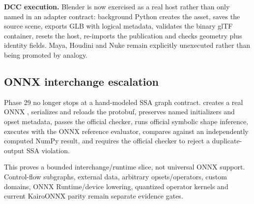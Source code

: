 \textbf{DCC execution.} Blender is now exercised as a real host rather than only named in an adapter contract: background Python creates the asset, saves the source scene, exports GLB with logical metadata, validates the binary glTF container, resets the host, re-imports the publication and checks geometry plus identity fields. Maya, Houdini and Nuke remain explicitly unexecuted rather than being promoted by analogy.

\subsection{ONNX interchange escalation}\label{appendix-2358b21a702d-onnx-interchange-escalation}

\hypertarget{appendix-2358b21a702d-onnx-interchange-escalation}{}

Phase 29 no longer stops at a hand-modeled SSA graph contract.  creates a real ONNX , serializes and reloads the protobuf, preserves named initializers and opset metadata, passes the official checker, runs official symbolic shape inference, executes  with the ONNX reference evaluator, compares against an independently computed NumPy result, and requires the official checker to reject a duplicate-output SSA violation.

This proves a bounded interchange/runtime slice, not universal ONNX support. Control-flow subgraphs, external data, arbitrary opsets/operators, custom domains, ONNX Runtime/device lowering, quantized operator kernels and current KairoONNX parity remain separate evidence gates.
